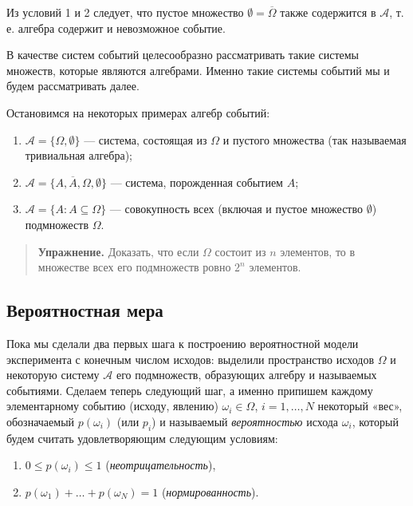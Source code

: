 \documentclass[11pt,a4paper]{article}
\providecommand{\tightlist}{%
      \setlength{\itemsep}{0pt}\setlength{\parskip}{0pt}}
\begin{document}
Из условий 1 и 2 следует, что пустое множество
\(\emptyset = \overline{\Omega}\) также содержится в \(\mathcal{A}\), т.
е. алгебра содержит и невозможное событие.

В качестве систем событий целесообразно рассматривать такие системы
множеств, которые являются алгебрами. Именно такие системы событий мы и
будем рассматривать далее.

Остановимся на некоторых примерах алгебр событий:

\begin{enumerate}
\def\labelenumi{\arabic{enumi}.}
\tightlist
\item
  \(\mathcal{A} = \{ \Omega, \emptyset \}\) --- система, состоящая из
  \(\Omega\) и пустого множества (так называемая тривиальная алгебра);
\item
  \(\mathcal{A} = \{ A, \overline{A}, \Omega, \emptyset \}\) ---
  система, порожденная событием \(A\);
\item
  \(\mathcal{A} = \{ A: A \subseteq \Omega \}\) --- совокупность всех
  (включая и пустое множество \(\emptyset\)) подмножеств \(\Omega\).
\end{enumerate}

\begin{quote}
\textbf{Упражнение.} Доказать, что если \(\Omega\) состоит из \(n\)
элементов, то в множестве всех его подмножеств ровно \(2^n\) элементов.
\end{quote}

    \hypertarget{ux432ux435ux440ux43eux44fux442ux43dux43eux441ux442ux43dux430ux44f-ux43cux435ux440ux430}{%
\subsection{Вероятностная
мера}\label{ux432ux435ux440ux43eux44fux442ux43dux43eux441ux442ux43dux430ux44f-ux43cux435ux440ux430}}

Пока мы сделали два первых шага к построению вероятностной модели
эксперимента с конечным числом исходов: выделили пространство исходов
\(\Omega\) и некоторую систему \(\mathcal{A}\) его подмножеств,
образующих алгебру и называемых событиями. Сделаем теперь следующий шаг,
а именно припишем каждому элементарному событию (исходу, явлению)
\(\omega_i \in \Omega\), \(i=1, \ldots, N\) некоторый «вес»,
обозначаемый \(p(\omega_i)\) (или \(p_i\)) и называемый
\emph{вероятностью} исхода \(\omega_i\), который будем считать
удовлетворяющим следующим условиям:

\begin{enumerate}
\def\labelenumi{\arabic{enumi}.}
\tightlist
\item
  \(0 \le p(\omega_i) \le 1\) (\emph{неотрицательность}),
\item
  \(p(\omega_1) + \ldots + p(\omega_N) = 1\) (\emph{нормированность}).
\end{enumerate}
\end{document}
